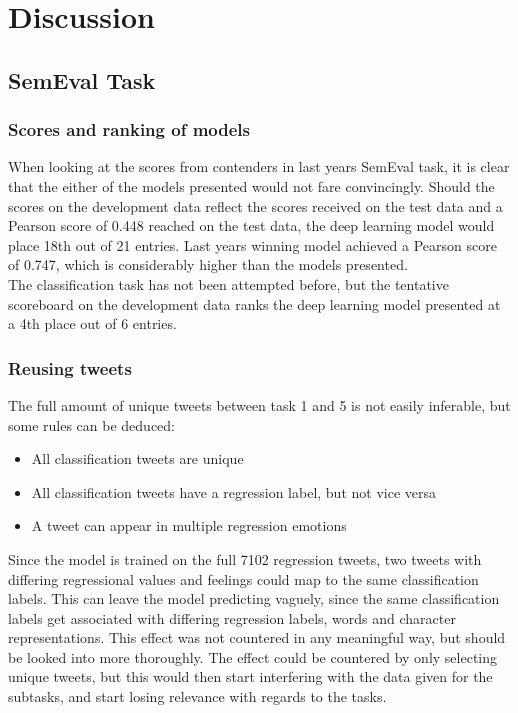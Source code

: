 
\section{Discussion}

\subsection{SemEval Task}

\subsubsection{Scores and ranking of models}
When looking at the scores from contenders in last years SemEval task, it is clear that the either of the models presented would not fare convincingly. Should the scores on the development data reflect the scores received on the test data and a Pearson score of 0.448 reached on the test data, the deep learning model would place 18th out of 21 entries. Last years winning model achieved a Pearson score of 0.747, which is considerably higher than the models presented.\\
The classification task has not been attempted before, but the tentative scoreboard on the development data ranks the deep learning model presented at a 4th place out of 6 entries.

\subsubsection{Reusing tweets} \label{sec:tweetreuse}
The full amount of unique tweets between task 1 and 5 is not easily inferable, but some rules can be deduced:\\
\begin{itemize}
\item All classification tweets are unique
\item All classification tweets have a regression label, but not vice versa
\item A tweet can appear in multiple regression emotions
\end{itemize}
Since the model is trained on the full 7102 regression tweets, two tweets with differing regressional values and feelings could map to the same classification labels. This can leave the model predicting vaguely, since the same classification labels get associated with differing regression labels, words and character representations. This effect was not countered in any meaningful way, but should be looked into more thoroughly. The effect could be countered by only selecting unique tweets, but this would then start interfering with the data given for the subtasks, and start losing relevance with regards to the tasks. 

